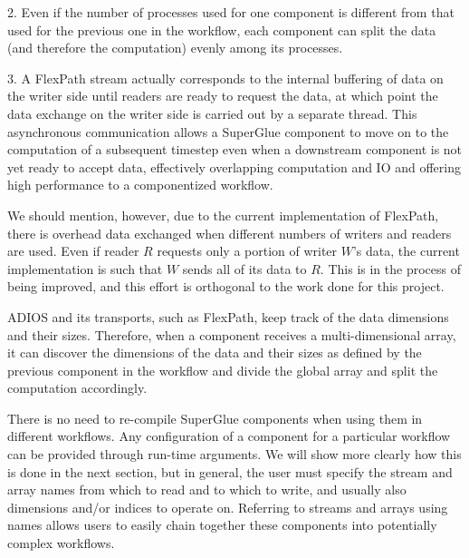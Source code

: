 2. Even if the number of processes used for one
component is different from that used for the previous
one in the workflow, each component can split the data
(and therefore the computation) evenly among its processes.

3. A FlexPath stream actually corresponds
to the internal buffering of data on the writer side
until readers are ready to request the data,
at which point the data exchange
on the writer side is carried out
by a separate thread.
This asynchronous communication allows a 
SuperGlue component to move on to the computation
of a subsequent timestep even when a downstream
component is not yet ready to accept data,
effectively overlapping computation and IO
and offering high performance to a componentized workflow.

We should mention, however, due to the current implementation of FlexPath, there is overhead
data exchanged when different numbers of writers and readers are used. Even if
reader $R$ requests only a portion of writer $W$'s data, the current implementation
is such that $W$ sends all of its data to $R$. This is in the process of being
improved, and this effort is orthogonal to the work done for this project.
\fi

ADIOS and its transports, such as FlexPath,
keep track of the
data dimensions and their sizes. Therefore, when a
component receives a
multi-dimensional array, it can discover the dimensions
of the data and their
sizes as defined by the previous component
in the workflow and divide the global array
and split the computation accordingly.

There is no need to re-compile SuperGlue components when using them
in different workflows. Any configuration
of a component for a particular workflow
can be provided through run-time arguments.
We will show more clearly how this is done in the next section,
but in general, the user must specify the
stream and array names from which to read
and to which to write,
and usually also dimensions and/or
indices to operate on.
Referring to
streams and arrays using names allows users to
easily chain together these
components into potentially complex workflows.

\fi
